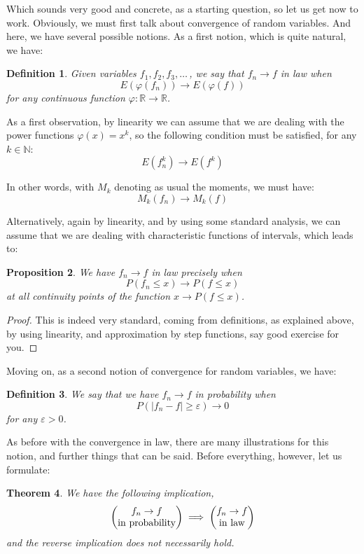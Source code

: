 \documentclass[12pt]{amsbook}
\newtheorem{theorem}{Theorem}[chapter]
\newtheorem{definition}[theorem]{Definition}
\newtheorem{proposition}[theorem]{Proposition}
\begin{document}
Which sounds very good and concrete, as a starting question, so let us get now to work. Obviously, we must first talk about convergence of random variables. And here, we have several possible notions. As a first notion, which is quite natural, we have:


\begin{definition}
Given variables $f_1,f_2,f_3,\ldots\,$, we say that $f_n\to f$ in law when 
$$E(\varphi(f_n))\to E(\varphi(f))$$
for any continuous function $\varphi:\mathbb R\to\mathbb R$.
\end{definition}

As a first observation, by linearity we can assume that we are dealing with the power functions $\varphi(x)=x^k$, so the following condition must be satisfied, for any $k\in\mathbb N$:
$$E(f_n^k)\to E(f^k)$$

In other words, with $M_k$ denoting as usual the moments, we must have:
$$M_k(f_n)\to M_k(f)$$

Alternatively, again by linearity, and by using some standard analysis, we can assume that we are dealing with characteristic functions of intervals, which leads to:

\begin{proposition}
We have $f_n\to f$ in law precisely when
$$P(f_n\leq x)\to P(f\leq x)$$
at all continuity points of the function $x\to P(f\leq x)$.
\end{proposition}

\begin{proof}
This is indeed very standard, coming from definitions, as explained above, by using linearity, and approximation by step functions, say good exercise for you.
\end{proof}

Moving on, as a second notion of convergence for random variables, we have:


\begin{definition}
We say that we have $f_n\to f$ in probability when 
$$P(|f_n-f|\geq\varepsilon)\to 0$$
for any $\varepsilon>0$.
\end{definition}

As before with the convergence in law, there are many illustrations for this notion, and further things that can be said. Before everything, however, let us formulate:

\begin{theorem}
We have the following implication,
$$\begin{pmatrix}f_n\to f\\ {\rm in\ probability}\end{pmatrix}\implies
\begin{pmatrix}f_n\to f\\ {\rm in\ law}\end{pmatrix}$$
and the reverse implication does not necessarily hold.
\end{theorem}
\end{document}
